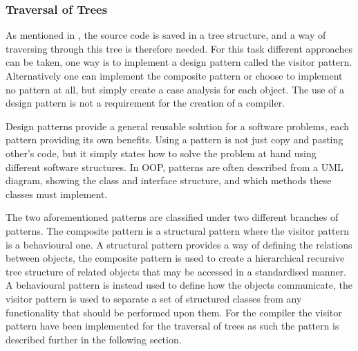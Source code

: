 \subsubsection*{Traversal of Trees}
As mentioned in , the source code is saved in a tree structure, and a way of traversing through this tree is therefore needed.
For this task different approaches can be taken, one way is to implement a design pattern called the visitor pattern.
Alternatively one can implement the composite pattern or choose to implement no pattern at all, but simply create a case analysis for each object.
The use of a design pattern is not a requirement for the creation of a compiler.

Design patterns provide a general reusable solution for a software problems, each pattern providing its own benefits.
Using a pattern is not just copy and pasting other's code, but it simply states how to solve the problem at hand using different software structures.
In OOP, patterns are often described from a UML diagram, showing the class and interface structure, and which methods these classes must implement. 

The two aforementioned patterns are classified under two different branches of patterns.
The composite pattern is a structural pattern where the visitor pattern is a behavioural one.
A structural pattern provides a way of defining the relations between objects, the composite pattern is used to create a hierarchical recursive tree structure of related objects that may be accessed in a standardised manner.
A behavioural pattern is instead used to define how the objects communicate, the visitor pattern is used to separate a set of structured classes from any functionality that should be performed upon them.
For the compiler the visitor pattern have been implemented for the traversal of trees as such the pattern is described further in the following section. 
